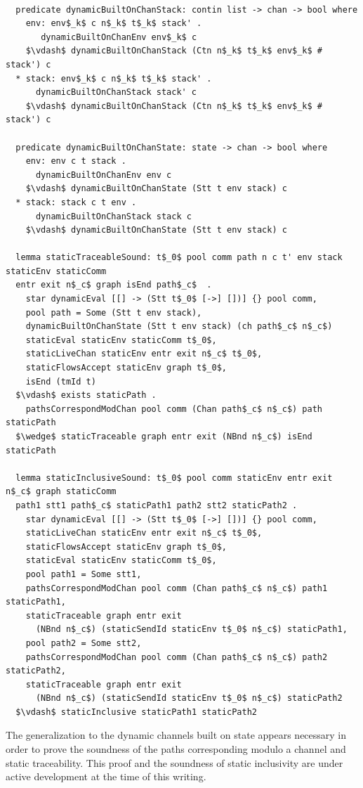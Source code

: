 \documentclass[letterpaper, 11pt]{extarticle}
\begin{document}
\begin{lstlisting}[language=logic, mathescape]

  predicate dynamicBuiltOnChanStack: contin list -> chan -> bool where
    env: env$_k$ c n$_k$ t$_k$ stack' .
       dynamicBuiltOnChanEnv env$_k$ c
    $\vdash$ dynamicBuiltOnChanStack (Ctn n$_k$ t$_k$ env$_k$ # stack') c
  * stack: env$_k$ c n$_k$ t$_k$ stack' .
      dynamicBuiltOnChanStack stack' c
    $\vdash$ dynamicBuiltOnChanStack (Ctn n$_k$ t$_k$ env$_k$ # stack') c
  
  predicate dynamicBuiltOnChanState: state -> chan -> bool where
    env: env c t stack . 
      dynamicBuiltOnChanEnv env c
    $\vdash$ dynamicBuiltOnChanState (Stt t env stack) c
  * stack: stack c t env .
      dynamicBuiltOnChanStack stack c
    $\vdash$ dynamicBuiltOnChanState (Stt t env stack) c

  lemma staticTraceableSound: t$_0$ pool comm path n c t' env stack staticEnv staticComm
  entr exit n$_c$ graph isEnd path$_c$  . 
    star dynamicEval [[] -> (Stt t$_0$ [->] [])] {} pool comm,
    pool path = Some (Stt t env stack),
    dynamicBuiltOnChanState (Stt t env stack) (ch path$_c$ n$_c$)
    staticEval staticEnv staticComm t$_0$,
    staticLiveChan staticEnv entr exit n$_c$ t$_0$,
    staticFlowsAccept staticEnv graph t$_0$, 
    isEnd (tmId t)
  $\vdash$ exists staticPath . 
    pathsCorrespondModChan pool comm (Chan path$_c$ n$_c$) path staticPath
  $\wedge$ staticTraceable graph entr exit (NBnd n$_c$) isEnd staticPath

  lemma staticInclusiveSound: t$_0$ pool comm staticEnv entr exit n$_c$ graph staticComm
  path1 stt1 path$_c$ staticPath1 path2 stt2 staticPath2 .
    star dynamicEval [[] -> (Stt t$_0$ [->] [])] {} pool comm, 
    staticLiveChan staticEnv entr exit n$_c$ t$_0$, 
    staticFlowsAccept staticEnv graph t$_0$, 
    staticEval staticEnv staticComm t$_0$, 
    pool path1 = Some stt1, 
    pathsCorrespondModChan pool comm (Chan path$_c$ n$_c$) path1 staticPath1, 
    staticTraceable graph entr exit
      (NBnd n$_c$) (staticSendId staticEnv t$_0$ n$_c$) staticPath1, 
    pool path2 = Some stt2, 
    pathsCorrespondModChan pool comm (Chan path$_c$ n$_c$) path2 staticPath2, 
    staticTraceable graph entr exit
      (NBnd n$_c$) (staticSendId staticEnv t$_0$ n$_c$) staticPath2
  $\vdash$ staticInclusive staticPath1 staticPath2
\end{lstlisting}



The generalization to the dynamic channels built on state appears necessary in order to prove the soundness of
the paths corresponding modulo a channel and static traceability. This proof and the soundness of static inclusivity
are under active development at the time of this writing.
\end{document}
